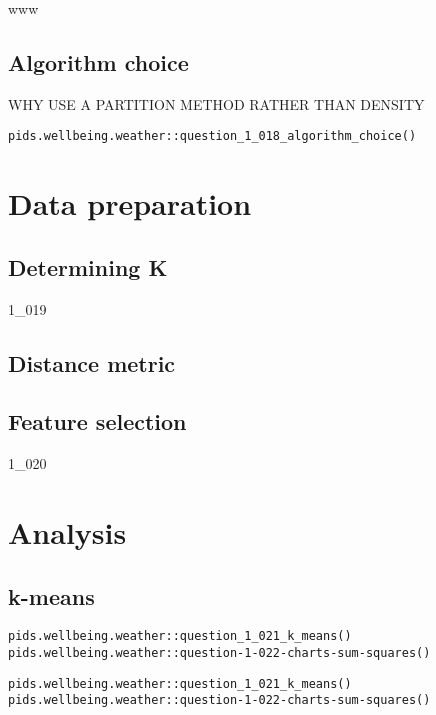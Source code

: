www\documentclass[12pt, oneside, openany]{book}
\begin{document}
\subsection*{Algorithm choice}

WHY USE A PARTITION METHOD RATHER THAN DENSITY

\begin{verbatim}
pids.wellbeing.weather::question_1_018_algorithm_choice()
\end{verbatim}

\section*{Data preparation}

\subsection*{Determining K}

1_019

\subsection*{Distance metric}

\subsection*{Feature selection}

1_020

\section*{Analysis}

\subsection*{k-means}

\begin{verbatim}
pids.wellbeing.weather::question_1_021_k_means()
pids.wellbeing.weather::question-1-022-charts-sum-squares()
\end{verbatim}

\begin{verbatim}
pids.wellbeing.weather::question_1_021_k_means()
pids.wellbeing.weather::question-1-022-charts-sum-squares()
\end{verbatim}
\end{document}

